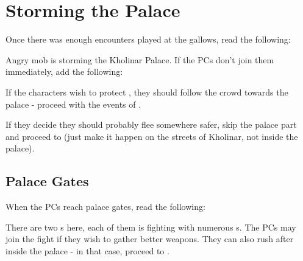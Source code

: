\section{Storming the Palace}
\label{sec:stormingPalace}

Once there was enough encounters played at the gallows, read the following:


Angry mob is storming the Kholinar Palace. If the PCs don't join them immediately, add the following:


If the characters wish to protect \npcTroublemaker{}, they should follow the crowd towards the palace - proceed with the events of . 

If they decide they should probably flee somewhere safer, skip the palace part and proceed to  (just make it happen on the streets of Kholinar, not inside the palace).



\subsection{Palace Gates}
\label{ssec:stormingPalaceGates}

When the PCs reach palace gates, read the following:


There are two \enemyQueensGuard{}s here, each of them is fighting with numerous \enemyRioter{}s. The PCs may join the fight if they wish to gather better weapons. They can also rush after \npcTroublemaker{} inside the palace - in that case, proceed to .



